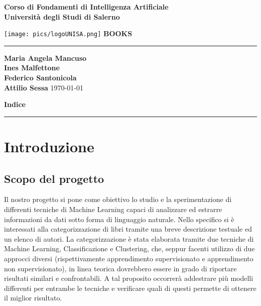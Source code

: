 \documentclass[12pt,oneside]{article}
\begin{document}
\begin{titlepage}
    \begin{flushright}
        \textbf{Corso di Fondamenti di Intelligenza Artificiale}
        \textbf{\\Università degli Studi di Salerno}
    \end{flushright}
    \vspace*{1.5cm}
    \centering
    \texttt{[image: pics/logoUNISA.png]}
    \vfill
    \Huge\textbf{BOOKS}
    \vspace{1ex}
    \rule{\linewidth}{1pt}
    \Large\textbf{Maria Angela Mancuso \\
        Ines Malfettone \\
        Federico Santonicola \\
        Attilio Sessa}
    \vfill
    \today
\end{titlepage}

\clearpage %

\setcounter{page}{1}

\begin{flushright}
        \Large\textbf{Indice}
\end{flushright}
\rule{\linewidth}{1pt}

\renewcommand{\contentsname}{}
\tableofcontents

\clearpage
\setcounter{section}{0}
\section{Introduzione}
    \begin{enumerate}
    \subsection{Scopo del progetto}
    \begin{justify}

        Il nostro progetto si pone come obiettivo lo studio e la sperimentazione di differenti tecniche di Machine Learning capaci di analizzare ed estrarre informazioni da dati sotto forma di linguaggio naturale. Nello specifico si è interessati alla categorizzazione di libri tramite una breve descrizione testuale ed un elenco di autori. La categorizzazione è stata elaborata tramite due tecniche di Machine Learning, Classificazione e Clustering, che, seppur facenti utilizzo di due approcci diversi (rispettivamente apprendimento supervisionato e apprendimento non supervisionato), in linea teorica dovrebbero essere in grado di riportare risultati similari e confrontabili. A tal proposito occorrerà addestrare più modelli differenti per entrambe le tecniche e verificare quali di questi permette di ottenere il miglior risultato.

    \end{justify}
    \end{enumerate}
\end{document}
